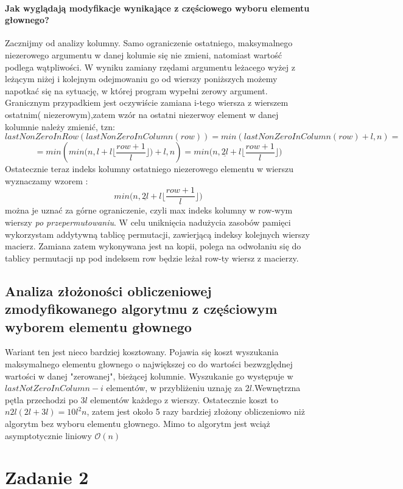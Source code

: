 \documentclass[11pt]{article}
\begin{document}
\begin{flushleft}
\paragraph{Jak wyglądają modyfikacje wynikające z częściowego wyboru elementu głownego?}
Zacznijmy od analizy kolumny. Samo ograniczenie ostatniego, maksymalnego niezerowego argumentu w danej kolumie się nie zmieni, natomiast wartość podlega wątpliwości. W wyniku zamiany rzędami argumentu leżacego wyżej z leżącym niżej i kolejnym odejmowaniu go od wierszy poniższych możemy napotkać się na sytuację, w której program wypełni zerowy argument. Granicznym przypadkiem jest oczywiście zamiana i-tego wiersza z wierszem ostatnim( niezerowym),zatem wzór na ostatni niezerwoy element w danej kolumnie należy zmienić, tzn: $$ lastNonZeroInRow(lastNonZeroInColumn(row))= min(lastNonZeroInColumn(row)+l,n) =
$$
$$ = min(min \Big( n, l+l \Big \lfloor \dfrac{row+1}{l} \Big \rfloor \Big) +l,n) = min \Big( n, \underline{2l}+l \Big \lfloor \dfrac{row+1}{l} \Big \rfloor \Big) $$
Ostatecznie teraz indeks kolumny ostatniego niezerowego elementu w wierszu wyznaczamy wzorem : $$min \Big( n, \underline{2l}+l \Big \lfloor \dfrac{row+1}{l} \Big \rfloor \Big)$$ można je uznać za górne ograniczenie, czyli max indeks kolumny w row-wym wierszy \textsl{po przepermutowaniu}.
W celu uniknięcia nadużycia zasobów pamięci wykorzystam addytywną tablicę permutacji, zawierjącą indeksy kolejnych wierszy macierz. Zamiana zatem wykonywana jest na kopii, polega na odwołaniu się do tablicy permutacji np pod indeksem row będzie leżał row-ty wiersz z macierzy. 
\subsection{Analiza złożoności obliczeniowej zmodyfikowanego algorytmu z częściowym wyborem elementu głownego}
Wariant ten jest nieco bardziej kosztowany. Pojawia się koszt wyszukania maksymalnego elementu głownego o największej co do wartości bezwzględnej wartości w danej "zerowanej", bieżącej kolumnie. Wyszukanie go występuje w $lastNotZeroInColumn - i$ elementów, w przybliżeniu uznaję za $2l$.Wewnętrzna pętla przechodzi po $3l$ elementów każdego z wierszy. Ostatecznie koszt to $n2l(2l+3l)=10l^2n$, zatem jest około 5 razy bardziej złożony obliczeniowo niż algorytm bez wyboru elementu głownego. Mimo to algorytm jest wciąż asymptotycznie liniowy $
\mathcal{O}(n)$
\section{Zadanie 2}

\end{flushleft}
\end{document}
